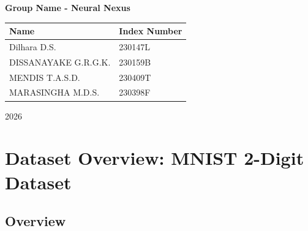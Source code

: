 \documentclass[12pt,a4paper]{report}
\begin{document}
\begin{titlepage}
{\Large\bfseries
Group Name - Neural Nexus
\par}

\vspace{0.4cm}

\begin{center}
\renewcommand{\arraystretch}{1.3}

\begin{tabular}{|p{8cm}|p{4cm}|}
\hline
\textbf{Name} & \textbf{Index Number} \\
\hline
Dilhara D.S. & 230147L \\
\hline
 DISSANAYAKE G.R.G.K.  & 230159B \\
\hline
MENDIS T.A.S.D.  & 230409T \\
\hline
 MARASINGHA M.D.S.  & 230398F \\
\hline

\end{tabular}

\end{center}

\vfill

{\large
2026
\par}

\end{titlepage}



\tableofcontents

\clearpage




\chapter{Dataset Overview: MNIST 2-Digit Dataset}

\section{Overview}
\end{document}
